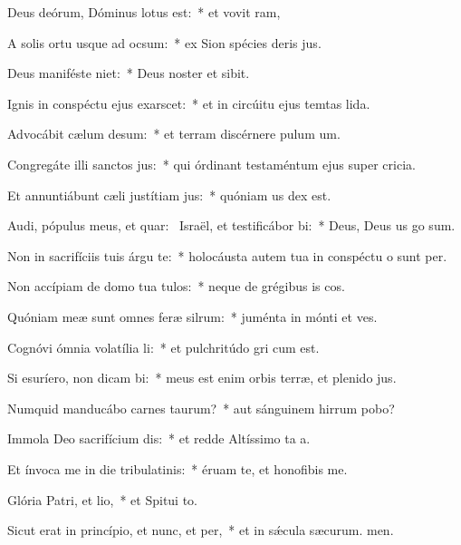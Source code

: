 \item Deus deórum, Dóminus lotus est:~* et vovit ram,
\item A solis ortu usque ad ocsum:~* ex Sion spécies deris jus.
\item Deus maniféste niet:~* Deus noster et  sibit.
\item Ignis in conspéctu ejus exarscet:~* et in circúitu ejus temtas lida.
\item Advocábit cælum desum:~* et terram discérnere pulum um.
\item Congregáte illi sanctos jus:~* qui órdinant testaméntum ejus super cricia.
\item Et annuntiábunt cæli justítiam jus:~* quóniam us dex est.
\item Audi, pópulus meus, et quar:~\pscross{} Israël, et testificábor bi:~* Deus, Deus us go sum.
\item Non in sacrifíciis tuis árgu te:~* holocáusta autem tua in conspéctu o sunt per.
\item Non accípiam de domo tua tulos:~* neque de grégibus is cos.
\item Quóniam meæ sunt omnes feræ silrum:~* juménta in mónti et ves.
\item Cognóvi ómnia volatília li:~* et pulchritúdo gri cum est.
\item Si esuríero, non dicam bi:~* meus est enim orbis terræ, et plenido jus.
\item Numquid manducábo carnes taurum?~* aut sánguinem hirrum pobo?
\item Immola Deo sacrifícium dis:~* et redde Altíssimo ta a.
\item Et ínvoca me in die tribulatinis:~* éruam te, et honofibis me.
\item Glória Patri, et lio,~* et Spitui to.
\item Sicut erat in princípio, et nunc, et per,~* et in sǽcula sæcurum. men.
